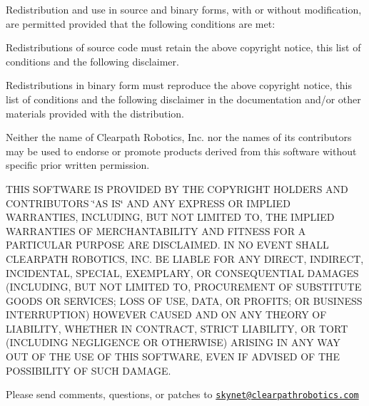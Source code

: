 Redistribution and use in source and binary forms, with or without modification, are permitted provided that the following conditions are met\+:
\begin{DoxyItemize}
\item Redistributions of source code must retain the above copyright notice, this list of conditions and the following disclaimer.
\item Redistributions in binary form must reproduce the above copyright notice, this list of conditions and the following disclaimer in the documentation and/or other materials provided with the distribution.
\item Neither the name of Clearpath Robotics, Inc. nor the names of its contributors may be used to endorse or promote products derived from this software without specific prior written permission.
\end{DoxyItemize}

T\+H\+IS S\+O\+F\+T\+W\+A\+RE IS P\+R\+O\+V\+I\+D\+ED BY T\+HE C\+O\+P\+Y\+R\+I\+G\+HT H\+O\+L\+D\+E\+RS A\+ND C\+O\+N\+T\+R\+I\+B\+U\+T\+O\+RS \char`\"{}\+A\+S I\+S\char`\"{} A\+ND A\+NY E\+X\+P\+R\+E\+SS OR I\+M\+P\+L\+I\+ED W\+A\+R\+R\+A\+N\+T\+I\+ES, I\+N\+C\+L\+U\+D\+I\+NG, B\+UT N\+OT L\+I\+M\+I\+T\+ED TO, T\+HE I\+M\+P\+L\+I\+ED W\+A\+R\+R\+A\+N\+T\+I\+ES OF M\+E\+R\+C\+H\+A\+N\+T\+A\+B\+I\+L\+I\+TY A\+ND F\+I\+T\+N\+E\+SS F\+OR A P\+A\+R\+T\+I\+C\+U\+L\+AR P\+U\+R\+P\+O\+SE A\+RE D\+I\+S\+C\+L\+A\+I\+M\+ED. IN NO E\+V\+E\+NT S\+H\+A\+LL C\+L\+E\+A\+R\+P\+A\+TH R\+O\+B\+O\+T\+I\+CS, I\+NC. BE L\+I\+A\+B\+LE F\+OR A\+NY D\+I\+R\+E\+CT, I\+N\+D\+I\+R\+E\+CT, I\+N\+C\+I\+D\+E\+N\+T\+AL, S\+P\+E\+C\+I\+AL, E\+X\+E\+M\+P\+L\+A\+RY, OR C\+O\+N\+S\+E\+Q\+U\+E\+N\+T\+I\+AL D\+A\+M\+A\+G\+ES (I\+N\+C\+L\+U\+D\+I\+NG, B\+UT N\+OT L\+I\+M\+I\+T\+ED TO, P\+R\+O\+C\+U\+R\+E\+M\+E\+NT OF S\+U\+B\+S\+T\+I\+T\+U\+TE G\+O\+O\+DS OR S\+E\+R\+V\+I\+C\+ES; L\+O\+SS OF U\+SE, D\+A\+TA, OR P\+R\+O\+F\+I\+TS; OR B\+U\+S\+I\+N\+E\+SS I\+N\+T\+E\+R\+R\+U\+P\+T\+I\+ON) H\+O\+W\+E\+V\+ER C\+A\+U\+S\+ED A\+ND ON A\+NY T\+H\+E\+O\+RY OF L\+I\+A\+B\+I\+L\+I\+TY, W\+H\+E\+T\+H\+ER IN C\+O\+N\+T\+R\+A\+CT, S\+T\+R\+I\+CT L\+I\+A\+B\+I\+L\+I\+TY, OR T\+O\+RT (I\+N\+C\+L\+U\+D\+I\+NG N\+E\+G\+L\+I\+G\+E\+N\+CE OR O\+T\+H\+E\+R\+W\+I\+SE) A\+R\+I\+S\+I\+NG IN A\+NY W\+AY O\+UT OF T\+HE U\+SE OF T\+H\+IS S\+O\+F\+T\+W\+A\+RE, E\+V\+EN IF A\+D\+V\+I\+S\+ED OF T\+HE P\+O\+S\+S\+I\+B\+I\+L\+I\+TY OF S\+U\+CH D\+A\+M\+A\+GE.

Please send comments, questions, or patches to \href{mailto:skynet@clearpathrobotics.com}{\tt skynet@clearpathrobotics.\+com}



